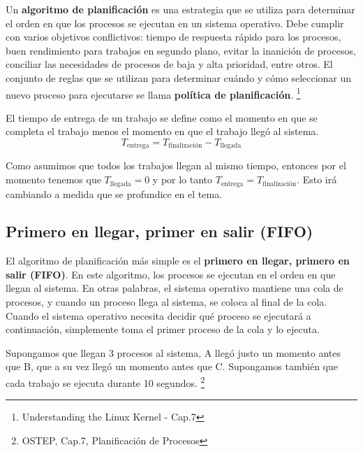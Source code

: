 \documentclass{article}
\begin{document}
\begin{definition}
    Un \textbf{algoritmo de planificación} es una estrategia que se utiliza para determinar el orden en que los procesos se ejecutan en un sistema operativo. Debe cumplir con varios objetivos conflictivos: tiempo de respuesta rápido para los procesos, buen rendimiento para trabajos en segundo plano, evitar la inanición de procesos, conciliar las necesidades de procesos de baja y alta prioridad, entre otros. El conjunto de reglas que se utilizan para determinar cuándo y cómo seleccionar un nuevo proceso para ejecutarse se llama \textbf{política de planificación}. \footnote{Understanding the Linux Kernel - Cap.7}
\end{definition}

\begin{definition}
    El tiempo de entrega de un trabajo se define como el momento en que se completa el trabajo menos el momento en que el trabajo llegó al sistema.    
    \begin{equation}
        T_{\text{entrega}} = T_{\text{finalización}} - T_{\text{llegada}}
    \end{equation}
\end{definition}

Como asumimos que todos los trabajos llegan al mismo tiempo, entonces por el momento tenemos que $T_{\text{llegada}} = 0$ y por lo tanto $T_{\text{entrega}} = T_{\text{finalización}}$. Esto irá cambiando a medida que se profundice en el tema.

\subsection{Primero en llegar, primer en salir (FIFO)}

El algoritmo de planificación más simple es el \textbf{primero en llegar, primero en salir (FIFO)}. En este algoritmo, los procesos se ejecutan en el orden en que llegan al sistema. En otras palabras, el sistema operativo mantiene una cola de procesos, y cuando un proceso llega al sistema, se coloca al final de la cola. Cuando el sistema operativo necesita decidir qué proceso se ejecutará a continuación, simplemente toma el primer proceso de la cola y lo ejecuta.

Supongamos que llegan $3$ procesos al sistema, A llegó justo un momento antes que B, que a su vez llegó un momento antes que C. Supongamos también que cada trabajo se ejecuta durante 10 segundos. \footnote{OSTEP, Cap.7, Planificación de Procesos}
\end{document}
